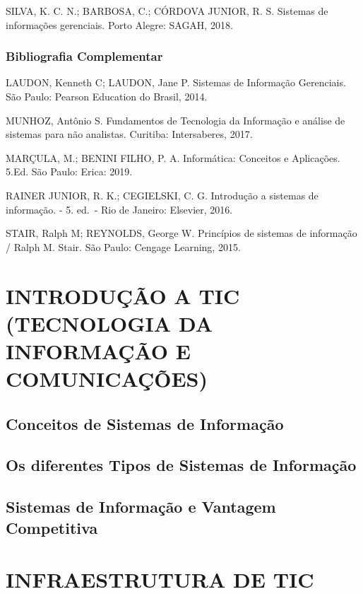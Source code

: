 \documentclass[
]{book}
\begin{document}
SILVA, K. C. N.; BARBOSA, C.; CÓRDOVA JUNIOR, R. S. Sistemas de informações gerenciais. Porto Alegre: SAGAH, 2018.

\subsection{Bibliografia Complementar}\label{bibliografia-complementar}

LAUDON, Kenneth C; LAUDON, Jane P. Sistemas de Informação Gerenciais. São Paulo: Pearson Education do Brasil, 2014.

MUNHOZ, Antônio S. Fundamentos de Tecnologia da Informação e análise de sistemas para não analistas. Curitiba: Intersaberes, 2017.

MARÇULA, M.; BENINI FILHO, P. A. Informática: Conceitos e Aplicações. 5.Ed. São Paulo: Erica: 2019.

RAINER JUNIOR, R. K.; CEGIELSKI, C. G. Introdução a sistemas de informação. - 5. ed.~- Rio de Janeiro: Elsevier, 2016.

STAIR, Ralph M; REYNOLDS, George W. Princípios de sistemas de informação / Ralph M. Stair. São Paulo: Cengage Learning, 2015.

\chapter{INTRODUÇÃO A TIC (TECNOLOGIA DA INFORMAÇÃO E COMUNICAÇÕES)}\label{introduuxe7uxe3o-a-tic-tecnologia-da-informauxe7uxe3o-e-comunicauxe7uxf5es}

\section{Conceitos de Sistemas de Informação}\label{conceitos-de-sistemas-de-informauxe7uxe3o}

\section{Os diferentes Tipos de Sistemas de Informação}\label{os-diferentes-tipos-de-sistemas-de-informauxe7uxe3o}

\section{Sistemas de Informação e Vantagem Competitiva}\label{sistemas-de-informauxe7uxe3o-e-vantagem-competitiva}

\chapter{INFRAESTRUTURA DE TIC}\label{infraestrutura-de-tic}
\end{document}

